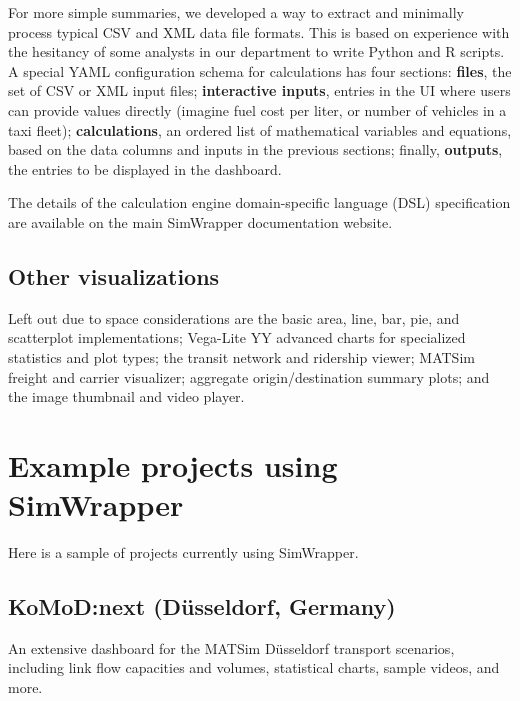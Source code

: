 \documentclass[3p,times,procedia]{elsarticle}
\begin{document}
For more simple summaries, we developed a way to extract and minimally process typical CSV and XML data file formats. This is based on experience with the hesitancy of some analysts in our department to write Python and R scripts. A special YAML configuration schema for calculations has four sections: \textbf{files}, the set of CSV or XML input files;  \textbf{interactive inputs}, entries in the UI where users can provide values directly (imagine fuel cost per liter, or number of vehicles in a taxi fleet); \textbf{calculations}, an ordered list of mathematical variables and equations, based on the data columns and inputs in the previous sections; finally, \textbf{outputs}, the entries to be displayed in the dashboard.

The details of the calculation engine domain-specific language (DSL) specification are available on the main SimWrapper documentation website.

\subsection{Other visualizations}

Left out due to space considerations are the basic area, line, bar, pie, and scatterplot implementations; Vega-Lite YY advanced charts for specialized statistics and plot types; the transit network and ridership viewer; MATSim freight and carrier visualizer; aggregate origin/destination summary plots; and the image thumbnail and video player.


\section{Example projects using SimWrapper}

Here is a sample of projects currently using SimWrapper.

\subsection{KoMoD:next (Düsseldorf, Germany)}

An extensive dashboard for the MATSim Düsseldorf transport scenarios, including link flow capacities and volumes, statistical charts, sample videos, and more.
\end{document}
